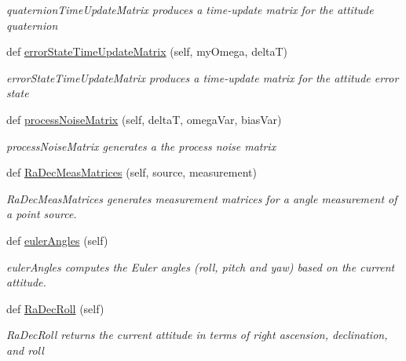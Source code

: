 \begin{DoxyCompactItemize}
\begin{DoxyCompactList}\small\item\em quaternion\+Time\+Update\+Matrix produces a time-\/update matrix for the attitude quaternion \end{DoxyCompactList}\item 
def \hyperlink{classmodest_1_1substates_1_1attitude_1_1Attitude_a06165c15ac5d7422a7bcd1e3f7ac24e7}{error\+State\+Time\+Update\+Matrix} (self, my\+Omega, deltaT)
\begin{DoxyCompactList}\small\item\em error\+State\+Time\+Update\+Matrix produces a time-\/update matrix for the attitude error state \end{DoxyCompactList}\item 
def \hyperlink{classmodest_1_1substates_1_1attitude_1_1Attitude_a11f6e9a0803c6843d7c89061ffbb3c2c}{process\+Noise\+Matrix} (self, deltaT, omega\+Var, bias\+Var)
\begin{DoxyCompactList}\small\item\em process\+Noise\+Matrix generates a the process noise matrix \end{DoxyCompactList}\item 
def \hyperlink{classmodest_1_1substates_1_1attitude_1_1Attitude_a1506706112528d3d926a77121bac7b1c}{Ra\+Dec\+Meas\+Matrices} (self, source, measurement)
\begin{DoxyCompactList}\small\item\em Ra\+Dec\+Meas\+Matrices generates measurement matrices for a angle measurement of a point source. \end{DoxyCompactList}\item 
def \hyperlink{classmodest_1_1substates_1_1attitude_1_1Attitude_aaca8893538cf2e6118214ea9cef69055}{euler\+Angles} (self)
\begin{DoxyCompactList}\small\item\em euler\+Angles computes the Euler angles (roll, pitch and yaw) based on the current attitude. \end{DoxyCompactList}\item 
def \hyperlink{classmodest_1_1substates_1_1attitude_1_1Attitude_a6fdadf88372f53c3ac216eaf015947db}{Ra\+Dec\+Roll} (self)
\begin{DoxyCompactList}\small\item\em Ra\+Dec\+Roll returns the current attitude in terms of right ascension, declination, and roll \end{DoxyCompactList}\item 

\end{DoxyCompactItemize}

